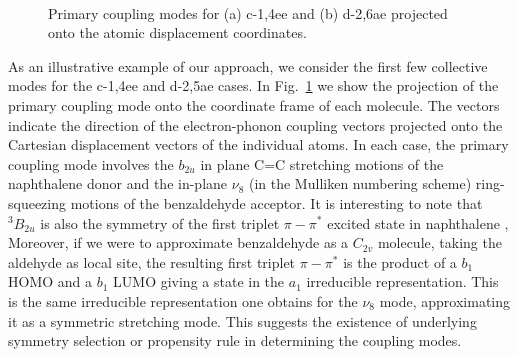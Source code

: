 
\begin{figure}[b]
\\
\caption{
Primary coupling modes for (a) c-1,4ee and (b) d-2,6ae projected onto the atomic displacement coordinates.
}\label{LanczosModes}
\end{figure}


As an illustrative example of our approach, we consider the
first few collective modes for the c-1,4ee and d-2,5ae cases.
 In Fig.~\ref{LanczosModes}
we show the projection of the primary coupling mode onto the
coordinate frame of each molecule.  The vectors indicate the direction
of the electron-phonon coupling vectors projected onto the Cartesian displacement
vectors of the individual atoms.   In each case, the primary
coupling mode involves the  $b_{2u}$ in plane C=C stretching motions of the naphthalene donor and the
 in-plane $\nu_{8}$ (in the Mulliken numbering scheme) ring-squeezing motions of the benzaldehyde acceptor\cite{doi:10.1021/jp961282l}.
It is interesting to note
that $^{3}B_{2u}$ is also the symmetry of the first triplet $\pi-\pi^{*}$ excited state in naphthalene \cite{doi:10.1021/j100066a007},
Moreover, if we were to approximate benzaldehyde as a $C_{2v}$ molecule, taking the aldehyde as local site,
the resulting first triplet $\pi-\pi^{*}$ is the product of a $b_{1}$ HOMO and a $b_{1}$ LUMO giving a state in the
  $a_{1}$ irreducible representation. This is the same irreducible representation one obtains for the $\nu_{8}$
  mode, approximating it as a symmetric stretching mode.
This suggests the existence of underlying symmetry selection or propensity rule in determining the coupling modes.


